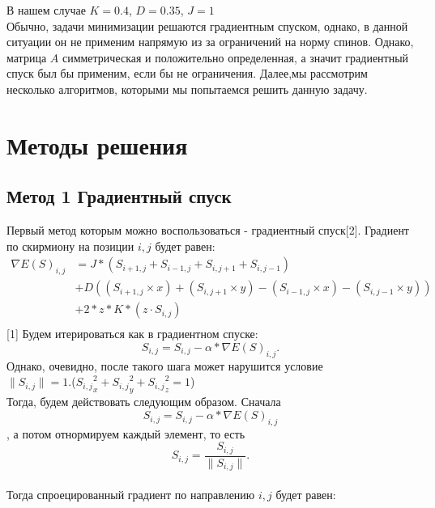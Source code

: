 \documentclass[ 12pt,x11names]{article}
\begin{document}
    В нашем случае $K = 0.4$, $D = 0.35$, $J = 1$\\
    Обычно, задачи минимизации решаются градиентным спуском, однако, в данной ситуации он не применим напрямую из за ограничений на норму спинов.
    Однако, матрица $A$ симметрическая и положительно определенная, а значит градиентный спуск был бы применим, если бы не ограничения.
    Далее,мы рассмотрим несколько алгоритмов, которыми мы попытаемся решить данную задачу.
    \newpage
    \section{Методы решения}
    \subsection{Метод 1 Градиентный спуск}
    Первый метод которым можно воспользоваться  - градиентный спуск[2]. Градиент по скирмиону на позиции $i, j$ будет равен:
 \begin{equation}
\label{eq:pareto mle2}
\begin{split}
    \nabla E(S)_{i, j} &= J * (S_{i + 1,j} + S_{i - 1,j} + S_{i, j + 1} + S_{i, j - 1})\\
        &+ D  ( (S_{i + 1,j} \times x) + (S_{i, j + 1} \times y) -  (S_{i - 1, j} \times x) - (S_{i, j - 1} \times y) )\\
        &+ 2 * z * K * (z \cdot S_{i, j})\\
    \end{split}
\end{equation}[1]
    Будем  итерироваться как в градиентном спуске:
\begin{equation}
\label{eq:pareto mle2}
S_{i, j} = S_{i, j} - \alpha * \nabla E(S)_{i, j}.
 \end{equation}
    Однако, очевидно, после такого шага может  нарушится условие\\ $\|S_{i, j}\| = 1$.(${S_{i,j}}_x^2 + {S_{i,j}}_y^2 + {S_{i,j}}_z^2 = 1$)\\
    Тогда, будем действовать следующим образом. Сначала
\begin{equation}
\label{eq:pareto mle2}
    S_{i, j} = S_{i, j} - \alpha * \nabla E(S)_{i, j}
\end{equation}, а потом отнормируем каждый элемент, то есть
\begin{equation}
\label{eq:pareto mle2}
  S_{i, j} = \frac{S_{i, j}}{\|S_{i, j}\|}.
  \end{equation}\\
    Тогда спроецированный градиент по направлению $i,j$ будет равен:\\
\end{document}

